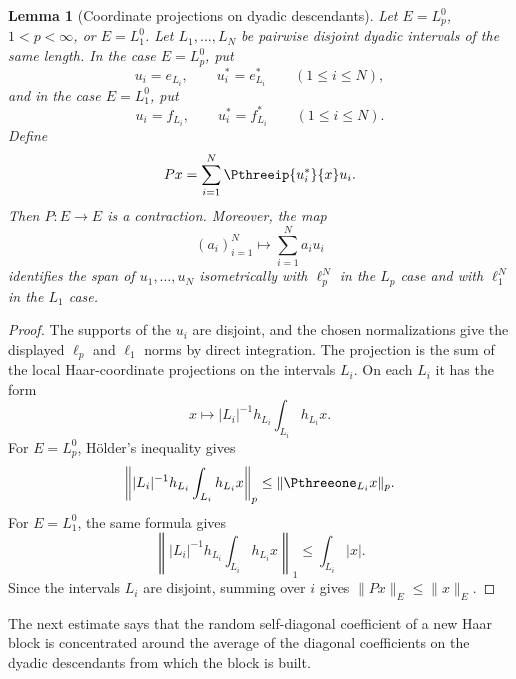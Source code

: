 \documentclass[11pt,reqno]{amsart}
\makeatletter
\theoremstyle{plain}
\newtheorem{lemma}[lemma]{Lemma}
\theoremstyle{definition}
\newcounter{problempaper}
\newenvironment{problempaperbody}{%
  \setcounter{subsection}{0}%
  \setcounter{subsubsection}{0}%
  \setcounter{paragraph}{0}%
  \renewcommand{\thesubsection}{\arabic{subsection}}%
  \renewcommand{\thesubsubsection}{\thesubsection.\arabic{subsubsection}}%
  \renewcommand{\theparagraph}{\thesubsubsection.\arabic{paragraph}}%
  \let\problem@outersection\section
  \let\problem@outersubsection\subsection
  \let\problem@outersubsubsection\subsubsection
  \let\problem@outerparagraph\paragraph
  \let\section\problem@papersection
  \let\subsection\problem@papersubsection
  \let\subsubsection\problem@papersubsubsection
}{%
  \let\section\problem@outersection
  \let\subsection\problem@outersubsection
  \let\subsubsection\problem@outersubsubsection
  \let\paragraph\problem@outerparagraph
}
\newcommand{\problem@target}[2]{%
  \hypertarget{problem-\theproblempaper-#1-#2}{}%
}
\newcommand{\problem@paperheading}[3]{%
  \par\bigskip
  \problem@target{#1}{#2}%
  \noindent{\large\bfseries #2.\quad #3\par}%
  \nobreak\smallskip
}
\newcommand{\problem@papersubheading}[3]{%
  \par\medskip
  \problem@target{#1}{#2}%
  \noindent{\normalsize\bfseries #2.\quad #3\par}%
  \nobreak\smallskip
}
\newcommand{\problem@papersubsubheading}[3]{%
  \par\smallskip
  \problem@target{#1}{#2}%
  \noindent{\normalsize\itshape #2.\quad #3.\ }%
}
\def\problem@papersection{%
  \@ifstar{\problem@papersectionstar}{\problem@papersectionnostar}%
}
\def\problem@papersectionstar#1{%
  \par\bigskip\noindent{\large\bfseries #1\par}\nobreak\smallskip
}
\def\problem@papersectionnostar#1{%
  \refstepcounter{subsection}%
  \setcounter{subsubsection}{0}%
  \setcounter{paragraph}{0}%
  \problem@paperheading{section}{\thesubsection}{#1}%
  \problem@writecontentsline{section}{\thesubsection}{#1}%
}
\def\problem@papersubsection{%
  \@ifstar{\problem@papersubsectionstar}{\problem@papersubsectionnostar}%
}
\def\problem@papersubsectionstar#1{%
  \par\medskip\noindent{\normalsize\bfseries #1\par}\nobreak\smallskip
}
\def\problem@papersubsectionnostar#1{%
  \refstepcounter{subsubsection}%
  \setcounter{paragraph}{0}%
  \problem@papersubheading{subsection}{\thesubsubsection}{#1}%
  \problem@writecontentsline{subsection}{\thesubsubsection}{#1}%
}
\def\problem@papersubsubsection{%
  \@ifstar{\problem@papersubsubsectionstar}{\problem@papersubsubsectionnostar}%
}
\def\problem@papersubsubsectionstar#1{%
  \par\smallskip\noindent{\normalsize\itshape #1.\ }%
}
\def\problem@papersubsubsectionnostar#1{%
  \refstepcounter{paragraph}%
  \problem@papersubsubheading{subsubsection}{\theparagraph}{#1}%
  \problem@writecontentsline{subsubsection}{\theparagraph}{#1}%
}
\newcommand{\problem@writecontentsline}[3]{%
  \begingroup
  \protected@write\@auxout{}{%
    \string\problemcontentsentry{\theproblempaper}{#1}{#2}{#3}{\thepage}%
  }%
  \endgroup
}
\newcommand{\problemcontentsentry}[5]{%
  \@ifundefined{problemcontents@#1}{%
    \expandafter\gdef\csname problemcontents@#1\endcsname{}%
  }{}%
  \expandafter\g@addto@macro\csname problemcontents@#1\endcsname{%
    \problemcontentsline{#1}{#2}{#3}{#4}{#5}%
  }%
}
\newcommand{\problemcontentslink}[4]{%
  \hyperlink{problem-#1-#2-#3}{#4}%
}
\newcommand{\problemcontentsline}[5]{%
  \ifstrequal{#2}{section}{%
    \par\noindent
    \problemcontentslink{#1}{#2}{#3}{\makebox[2.5em][l]{#3}#4}%
    \nobreak\dotfill
    \problemcontentslink{#1}{#2}{#3}{#5}\par
  }{%
    \ifstrequal{#2}{subsection}{%
      \par\noindent\hspace*{1.5em}%
      \problemcontentslink{#1}{#2}{#3}{\makebox[3.5em][l]{#3}#4}%
      \nobreak\dotfill
      \problemcontentslink{#1}{#2}{#3}{#5}\par
    }{%
      \par\noindent\hspace*{3em}%
      \problemcontentslink{#1}{#2}{#3}{\makebox[4.5em][l]{#3}#4}%
      \nobreak\dotfill
      \problemcontentslink{#1}{#2}{#3}{#5}\par
    }%
  }%
}
\makeatother
\begin{document}
\begin{problempaperbody}
\begin{lemma}[Coordinate projections on dyadic descendants]
\label{p3:lem:packet-coordinates}
Let $E=L_p^0$, $1<p<\infty$, or $E=L_1^0$. Let $L_1,\ldots,L_N$ be pairwise disjoint dyadic intervals of the same length. In the case $E=L_p^0$, put
\begin{equation*}
        u_i=e_{L_i},\qquad u_i^*=e_{L_i}^*\qquad(1\leq i\leq N),
\end{equation*}
and in the case $E=L_1^0$, put
\begin{equation*}
        u_i=f_{L_i},\qquad u_i^*=f_{L_i}^*\qquad(1\leq i\leq N).
\end{equation*}
Define
\begin{equation*}
        Px=\sum_{i=1}^N\Pthreeip{u_i^*}{x}u_i .
\end{equation*}
Then $P\colon E\to E$ is a contraction. Moreover, the map
\begin{equation*}
        (a_i)_{i=1}^N\longmapsto \sum_{i=1}^N a_iu_i
\end{equation*}
identifies the span of $u_1,\ldots,u_N$ isometrically with $\ell_p^N$ in the $L_p$ case and with $\ell_1^N$ in the $L_1$ case.
\end{lemma}

\begin{proof}
The supports of the $u_i$ are disjoint, and the chosen normalizations give the displayed $\ell_p$ and $\ell_1$ norms by direct integration. The projection is the sum of the local Haar-coordinate projections on the intervals $L_i$. On each $L_i$ it has the form
\begin{equation*}
        x\longmapsto |L_i|^{-1}h_{L_i}\int_{L_i}h_{L_i}x .
\end{equation*}
For $E=L_p^0$, H\"older's inequality gives
\begin{equation*}
        \left\||L_i|^{-1}h_{L_i}\int_{L_i}h_{L_i}x\right\|_p\leq \|\Pthreeone_{L_i}x\|_p .
\end{equation*}
For $E=L_1^0$, the same formula gives
\begin{equation*}
        \left\||L_i|^{-1}h_{L_i}\int_{L_i}h_{L_i}x\right\|_1\leq \int_{L_i}|x|.
\end{equation*}
Since the intervals $L_i$ are disjoint, summing over $i$ gives $\|Px\|_E\leq\|x\|_E$.
\end{proof}

The next estimate says that the random self-diagonal coefficient of a new Haar block is concentrated around the average of the diagonal coefficients on the dyadic descendants from which the block is built.


\end{problempaperbody}
\end{document}

